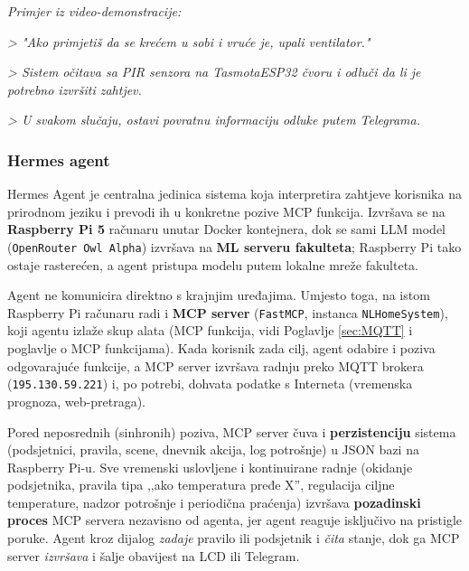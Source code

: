 \documentclass[11pt,a4paper]{article}
\begin{document}
\medskip

\textit{Primjer iz video-demonstracije:}

\textit{> "Ako primjetiš da se krećem u sobi i vruće je, upali ventilator."}

\textit{> Sistem očitava sa PIR senzora na TasmotaESP32 čvoru i odluči da li je potrebno izvršiti zahtjev.}

\textit{> U svakom slučaju, ostavi povratnu informaciju odluke putem Telegrama.}

\pagebreak




\subsubsection{Hermes agent}

Hermes Agent je centralna jedinica sistema koja interpretira zahtjeve korisnika na
prirodnom jeziku i prevodi ih u konkretne pozive MCP funkcija. Izvršava se na
\textbf{Raspberry Pi 5} računaru unutar Docker kontejnera, dok se sami LLM model
(\texttt{OpenRouter Owl Alpha}) izvršava na \textbf{ML serveru fakulteta}; Raspberry Pi tako
ostaje rasterećen, a agent pristupa modelu putem lokalne mreže fakulteta.

Agent ne komunicira direktno s krajnjim uređajima. Umjesto toga, na istom Raspberry Pi
računaru radi i \textbf{MCP server} (\texttt{FastMCP}, instanca \texttt{NLHomeSystem}),
koji agentu izlaže skup alata (MCP funkcija, vidi Poglavlje \ref{sec:MQTT} i poglavlje o
MCP funkcijama). Kada korisnik zada cilj, agent odabire i poziva odgovarajuće funkcije, a
MCP server izvršava radnju preko MQTT brokera (\texttt{195.130.59.221}) i, po potrebi,
dohvata podatke s Interneta (vremenska prognoza, web-pretraga).

Pored neposrednih (sinhronih) poziva, MCP server čuva i \textbf{perzistenciju} sistema
(podsjetnici, pravila, scene, dnevnik akcija, log potrošnje) u JSON bazi na Raspberry Pi-u.
Sve vremenski uslovljene i kontinuirane radnje (okidanje podsjetnika, pravila tipa
,,ako temperatura pređe X'', regulacija ciljne temperature, nadzor potrošnje i periodična
praćenja) izvršava \textbf{pozadinski proces} MCP servera nezavisno od agenta, jer agent
reaguje isključivo na pristigle poruke. Agent kroz dijalog \emph{zadaje} pravilo ili
podsjetnik i \emph{čita} stanje, dok ga MCP server \emph{izvršava} i šalje obavijest na
LCD ili Telegram.
\end{document}
